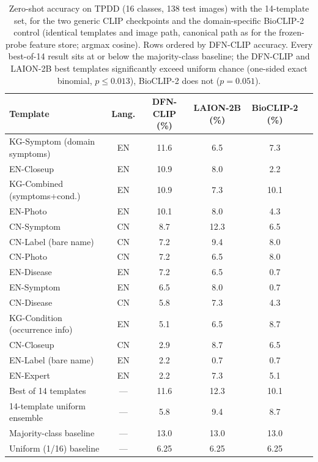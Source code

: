 \documentclass[10pt,a4paper]{article}
\begin{document}
\begin{table}[!ht]
\centering
\caption{Zero-shot accuracy on TPDD (16 classes, 138 test images) with the 14-template set, for the two generic CLIP checkpoints and the domain-specific BioCLIP-2 control (identical templates and image path, canonical path as for the frozen-probe feature store; argmax cosine). Rows ordered by DFN-CLIP accuracy. Every best-of-14 result sits at or below the majority-class baseline; the DFN-CLIP and LAION-2B best templates significantly exceed uniform chance (one-sided exact binomial, $p\leq0.013$), BioCLIP-2 does not ($p=0.051$).}
\label{tab:prompts}
\setlength{\tabcolsep}{4pt}
\begin{tabular}{lccccc}
\toprule
\textbf{Template} & \textbf{Lang.} & \textbf{DFN-CLIP (\%)} & \textbf{LAION-2B (\%)} & \textbf{BioCLIP-2 (\%)} \\
\midrule
KG-Symptom (domain symptoms)    & EN & 11.6 & 6.5 & 7.3 \\
EN-Closeup                      & EN & 10.9 & 8.0 & 2.2 \\
KG-Combined (symptoms+cond.)    & EN & 10.9 & 7.3 & 10.1 \\
EN-Photo                        & EN & 10.1 & 8.0 & 4.3 \\
CN-Symptom                      & CN & 8.7 & 12.3 & 6.5 \\
CN-Label (bare name)            & CN & 7.2 & 9.4 & 8.0 \\
CN-Photo                        & CN & 7.2 & 6.5 & 8.0 \\
EN-Disease                      & EN & 7.2 & 6.5 & 0.7 \\
EN-Symptom                      & EN & 6.5 & 8.0 & 0.7 \\
CN-Disease                      & CN & 5.8 & 7.3 & 4.3 \\
KG-Condition (occurrence info)  & EN & 5.1 & 6.5 & 8.7 \\
CN-Closeup                      & CN & 2.9 & 8.7 & 6.5 \\
EN-Label (bare name)            & EN & 2.2 & 0.7 & 0.7 \\
EN-Expert                       & EN & 2.2 & 7.3 & 5.1 \\
\midrule
Best of 14 templates            & --- & 11.6 & 12.3 & 10.1 \\
14-template uniform ensemble    & --- & 5.8 & 9.4 & 8.7 \\
Majority-class baseline         & --- & 13.0 & 13.0 & 13.0 \\
Uniform (1/16) baseline         & --- & 6.25 & 6.25 & 6.25 \\
\bottomrule
\end{tabular}
\end{table}
\end{document}
